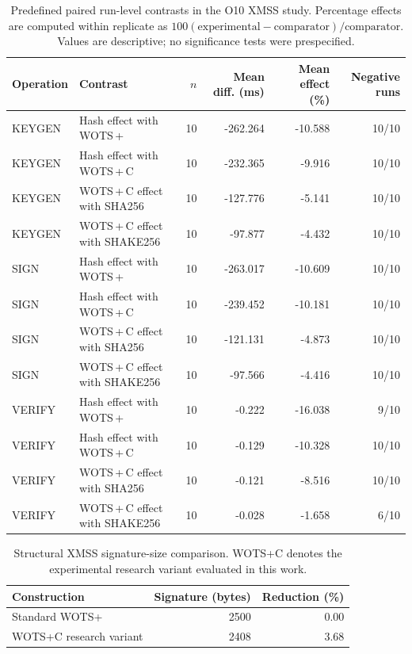 \begin{table}[t]
\centering
\caption{Predefined paired run-level contrasts in the O10 XMSS study. Percentage effects are computed within replicate as $100(\mathrm{experimental}-\mathrm{comparator})/\mathrm{comparator}$. Values are descriptive; no significance tests were prespecified.}
\label{tab:o10_primary_contrasts}
\footnotesize
\begin{tabular}{llrrrr}
\toprule
Operation & Contrast & $n$ & Mean diff. (ms) & Mean effect (\%) & Negative runs\\
\midrule
KEYGEN & Hash effect with WOTS\,+\, & 10 & -262.264 & -10.588 & 10/10 \\
KEYGEN & Hash effect with WOTS\,+\,C & 10 & -232.365 & -9.916 & 10/10 \\
KEYGEN & WOTS\,+\,C effect with SHA256 & 10 & -127.776 & -5.141 & 10/10 \\
KEYGEN & WOTS\,+\,C effect with SHAKE256 & 10 & -97.877 & -4.432 & 10/10 \\
SIGN & Hash effect with WOTS\,+\, & 10 & -263.017 & -10.609 & 10/10 \\
SIGN & Hash effect with WOTS\,+\,C & 10 & -239.452 & -10.181 & 10/10 \\
SIGN & WOTS\,+\,C effect with SHA256 & 10 & -121.131 & -4.873 & 10/10 \\
SIGN & WOTS\,+\,C effect with SHAKE256 & 10 & -97.566 & -4.416 & 10/10 \\
VERIFY & Hash effect with WOTS\,+\, & 10 & -0.222 & -16.038 & 9/10 \\
VERIFY & Hash effect with WOTS\,+\,C & 10 & -0.129 & -10.328 & 10/10 \\
VERIFY & WOTS\,+\,C effect with SHA256 & 10 & -0.121 & -8.516 & 10/10 \\
VERIFY & WOTS\,+\,C effect with SHAKE256 & 10 & -0.028 & -1.658 & 6/10 \\
\bottomrule
\end{tabular}
\end{table}

\begin{table}[t]
\centering
\caption{Structural XMSS signature-size comparison. WOTS+C denotes the experimental research variant evaluated in this work.}
\label{tab:o10_signature_size}
\footnotesize
\begin{tabular}{lrr}
\toprule
Construction & Signature (bytes) & Reduction (\%)\\
\midrule
Standard WOTS+ & 2500 & 0.00\\
WOTS+C research variant & 2408 & 3.68\\
\bottomrule
\end{tabular}
\end{table}
